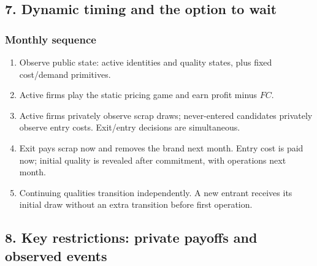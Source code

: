 \documentclass[11pt,]{article}
\providecommand{\tightlist}{%
  \setlength{\itemsep}{0pt}\setlength{\parskip}{0pt}}
\begin{document}
\clearpage

\subsection{7. Dynamic timing and the option to
wait}\label{dynamic-timing-and-the-option-to-wait}

\subsubsection{Monthly sequence}\label{monthly-sequence}

\begin{enumerate}
\def\labelenumi{\arabic{enumi}.}
\tightlist
\item
  Observe public state: active identities and quality states, plus fixed
  cost/demand primitives.
\item
  Active firms play the static pricing game and earn profit minus
  \(FC\).
\item
  Active firms privately observe scrap draws; never-entered candidates
  privately observe entry costs. Exit/entry decisions are simultaneous.
\item
  Exit pays scrap now and removes the brand next month. Entry cost is
  paid now; initial quality is revealed after commitment, with
  operations next month.
\item
  Continuing qualities transition independently. A new entrant receives
  its initial draw without an extra transition before first operation.
\end{enumerate}

\clearpage

\subsection{8. Key restrictions: private payoffs and observed
events}\label{key-restrictions-private-payoffs-and-observed-events}
\end{document}
